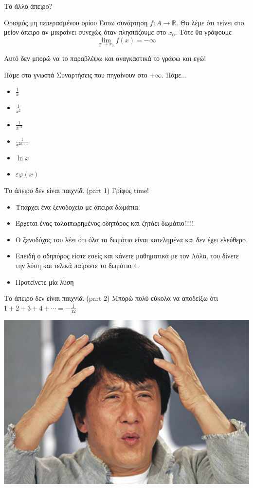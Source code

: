 \documentclass[greek]{beamer}
\begin{document}
\begin{frame}{Το άλλο άπειρο?}
 \begin{block}{Ορισμός μη πεπερασμένου ορίου}
  Έστω συνάρτηση $f:Α\to\mathbb{R}$. Θα λέμε ότι τείνει στο μείον άπειρο αν μικραίνει συνεχώς όταν πλησιάζουμε στο $x_0$. Τότε θα γράφουμε
  $$\lim\limits_{x \to x_0}{ f(x) }=-\infty$$
 \end{block} \pause
 Αυτό δεν μπορώ να το παραβλέψω και αναγκαστικά το γράφω και εγώ!
\end{frame}

\begin{frame}{Πάμε στα γνωστά}
 Συναρτήσεις που πηγαίνουν στο $+\infty$. \pause Πάμε... \pause
 \begin{itemize}
  \item $\frac{1}{x}$
  \item $\frac{1}{x^2}$
  \item $\frac{1}{x^{2k}}$
  \item $\frac{1}{x^{2k+1}}$
  \item $\ln{x}$
  \item $εφ(x)$
 \end{itemize}
\end{frame}

\begin{frame}{Το άπειρο δεν είναι παιχνίδι (part 1)}
 Γρίφος time!
 \begin{itemize}
  \item Υπάρχει ένα ξενοδοχείο με άπειρα δωμάτια.
  \item Έρχεται ένας ταλαιπωρημένος οδηπόρος και ζητάει δωμάτιο!!!!!
  \item Ο ξενοδόχος του λέει ότι όλα τα δωμάτια είναι κατελημένα και δεν έχει ελεύθερο.
  \item Επειδή ο οδηπόρος είστε εσείς και κάνετε μαθηματικά με τον Λόλα, του δίνετε την λύση και τελικά παίρνετε το δωμάτιο 4.
  \item Προτείνετε μία λύση
 \end{itemize}
\end{frame}

\begin{frame}{Το άπειρο δεν είναι παιχνίδι (part 2)}
 Μπορώ πολύ εύκολα να αποδείξω ότι $1+2+3+4+\cdots = -\frac{1}{12}$

 \centering
 \includegraphics[height=0.4\columnwidth]{images/qiev6}
\end{frame}
\end{document}
